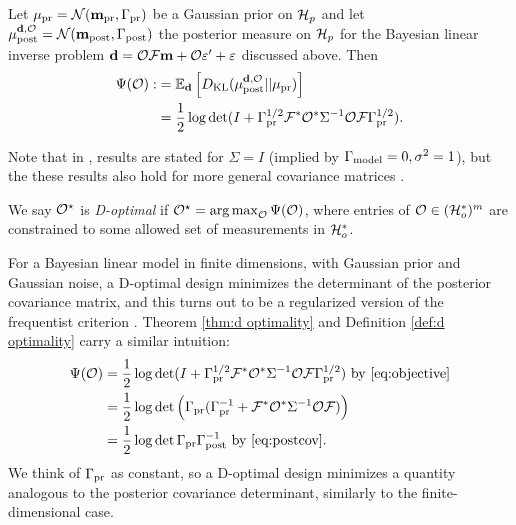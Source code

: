 \begin{theorem}\label{thm:d optimality}
  Let $\mu_{\textup{pr}} = \mathcal{N}(\mathbf{m}_{\textup{pr}},\Gamma_{\textup{pr}})$ be a Gaussian prior on $\mathcal{H}_p$
  and let $\mu_{\textup{post}}^{\mathbf{d}, \mathcal{O}} = \mathcal{N}(\mathbf{m}_{\textup{post}},\Gamma_{\textup{post}})$ the posterior measure
  on $\mathcal{H}_p$ for the Bayesian linear inverse problem $\mathbf{d} = \mathcal{O}
  \mathcal{F}\mathbf{m} + \mathcal{O} \varepsilon' + \varepsilon$ discussed above. Then
  \begin{align}\label{eq:objective}
    \begin{split}
      \Psi( \mathcal{O}) :&= \mathbb{E}_{\mathbf{d}}\left [ D_{\text{KL}} (\mu_{\textup{post}}^{\mathbf{d}, \mathcal{O}} || \mu_{\textup{pr}} ) \right ] \\
      &= \frac12 \log \det 
      ( I + \Gamma_{\textup{pr}}^{1/2}  \mathcal{F} ^* \mathcal{O}^* \Sigma^{-1} \mathcal{O} \mathcal{F} \Gamma_{\textup{pr}}^{1/2}).
    \end{split}
  \end{align}
\end{theorem}

Note that in \cite{AlexanderianGloorGhattas14,
  alexanderian2018efficient}, results are stated for $\Sigma=I$
(implied by $\Gamma_{\textup{model}} = 0,\sigma^2=1$), but the these results also hold
for more general covariance matrices
\cite[p. 681]{AlexanderianGloorGhattas14}.

\begin{definition}\label{def:d optimality}
  We say $\mathcal{O}^{\star}$ is \emph{D-optimal} if $\mathcal{O}^{\star} =
  \operatorname*{arg\,max}_{\mathcal{O}} \Psi(\mathcal{O})$, where entries of $\mathcal{O} \in (\mathcal{H}_o^*)^m$
  are constrained to some allowed set of measurements in $\mathcal{H}_o^*$.
\end{definition}

For a Bayesian linear model in finite dimensions, with Gaussian prior
and Gaussian noise, a D-optimal design minimizes the determinant of
the posterior covariance matrix, and this turns out to be a
regularized version of the frequentist criterion
\cite{Chaloner1995}. Theorem \ref{thm:d optimality} and Definition
\ref{def:d optimality} carry a similar intuition:
\begin{align*}
  \begin{split}
    \Psi(\mathcal{O}) &= \frac12 \log \det ( I + \Gamma_{\textup{pr}}^{1/2}  \mathcal{F} ^* \mathcal{O}^* \Sigma^{-1} \mathcal{O} \mathcal{F} \Gamma_{\textup{pr}}^{1/2}) \text{ by \eqref{eq:objective}}\\
    &= \frac12 \log \det \Big( \Gamma_{\textup{pr}} ( \Gamma_{\textup{pr}}^{-1} + \mathcal{F} ^* \mathcal{O}^* \Sigma^{-1} \mathcal{O} \mathcal{F}) \Big )\\
    &= \frac12 \log \det \Gamma_{\textup{pr}} \Gamma_{\textup{post}}^{-1} \text{ by \eqref{eq:postcov}}.
  \end{split}
\end{align*}
We think of $\Gamma_{\textup{pr}}$ as constant, so a D-optimal design minimizes a
quantity analogous to the posterior covariance determinant, similarly
to the finite-dimensional case.


